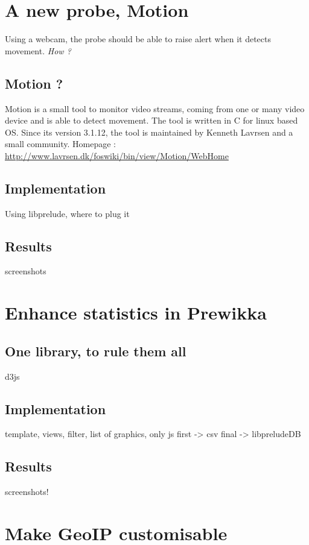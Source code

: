 \documentclass{koala-en}
\begin{document}
\section{A new probe, Motion}
Using a webcam, the probe should be able to raise alert when it detects movement. \emph{How ?}
\subsection{Motion ?}
Motion is a small tool to monitor video streams, coming from one or many video device and is able to detect movement.
\newline
\newline
The tool is written in C for linux based OS.
\newline
\newline
Since its version 3.1.12, the tool is maintained by Kenneth Lavrsen and a small community.
\newline
Homepage : \url{http://www.lavrsen.dk/foswiki/bin/view/Motion/WebHome}

\subsection{Implementation}
Using libprelude, where to plug it
\subsection{Results}
screenshots

\section{Enhance statistics in Prewikka}
\subsection{One library, to rule them all}
d3js
\subsection{Implementation}
template, views, filter, list of graphics, only js
first -> csv
final -> libpreludeDB
\subsection{Results}
screenshots!

\section{Make GeoIP customisable}
\end{document}
